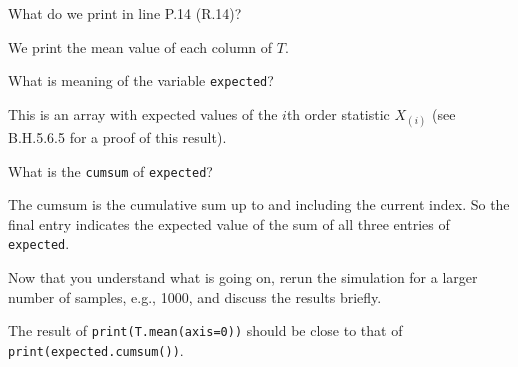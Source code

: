 \begin{exercise}
What do we print in line P.14 (R.14)?
\begin{solution}
We print the mean value of each column of $T$.
\end{solution}
\end{exercise}

\begin{exercise}
What is meaning of the variable \texttt{expected}?
\begin{solution}
This is an array with expected values of the $i$th order statistic $X_{(i)}$ (see B.H.5.6.5 for a proof of this result).
\end{solution}
\end{exercise}

\begin{exercise}
 What is the \texttt{cumsum} of \texttt{expected}?
\begin{solution}
The cumsum is the cumulative sum up to and including the current index. So the final entry indicates the expected value of the sum of all three entries of \verb|expected|.
\end{solution}
\end{exercise}

\begin{exercise}
 Now that you understand what is going on, rerun the simulation for a larger number of samples, e.g., 1000, and discuss the results briefly.
\begin{solution}
The result of \verb|print(T.mean(axis=0))| should be close to that of \verb|print(expected.cumsum())|.
\end{solution}
\end{exercise}
